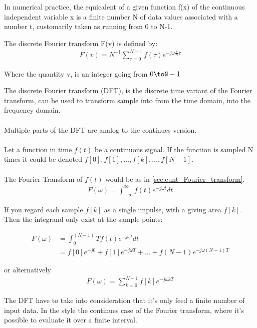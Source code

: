 In numerical practice, the equicalent of a given function f(x) of the continuous independent variable x is a finite number N of data values associated with a number t, customarily taken as running from 0 to N-1.

The discrete Fourier transform F(v) is defined by:
\begin{align*}
	F(v)= N^{-1}\sum_{\tau = 0}^{N-1}f(\tau)e^{-j \omega \frac{v}{N}\tau}
\end{align*}

Where the quantity v, is an integer going from $0\toN-1$

The discrete Fourier transform (DFT), is the discrete time variant of the Fourier transform, can be used to transform sample into from the time domain, into the frequency domain.
\\\\
Multiple parts of the DFT are analog to the continues version.
\\\\
Let a function in time $f(t)$ be a continuous signal.
If the function is sampled N times it could be denoted
$f[0],f[1],\dots,f[k],\dots,f[N-1]$.
\\\\
The Fourier Transform of $f(t)$ would be as in \ref{sec:cunt_Fourier_transform}.
\begin{align*}
	F(\omega) = \int_{-\infty}^\infty f(t)e^{-j\omega t} dt
\end{align*}

If you regard each sample $f[k]$ as a single impulse, with a giving area $f[k]$. Then the integrand only exist at the sample points:

\begin{align*}
	F(\omega) 
	&= \int_0^(N-1)T f(t) e^{-j\omega t}dt\\
	&= f[0]e^{-j0} + f[1]e^{-j\omega T} + \dots + f(N-1) e^{-j\omega(N-1)T}	
\end{align*}

or alternatively
\begin{align*}
	F(\omega) = \sum_{k=0}^{N-1}f[k]e^{-j\omega k T}
\end{align*} 


The DFT have to take into consideration that it's only feed a finite number of input data. 
In the style the continues case of the Fourier transform, where it's possible to evaluate it over a finite interval.
